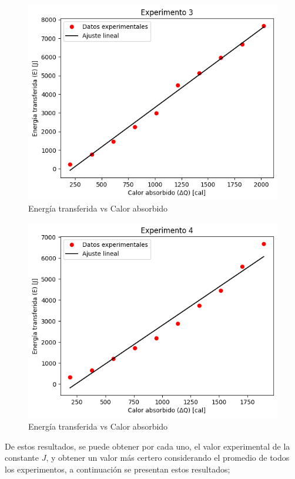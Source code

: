 \documentclass[10pt]{article}
\begin{document}
\begin{multicols*}{2}
\begin{figure}[H]
    \includegraphics[scale=0.45]{exp3.png}
    \caption{Energía transferida vs Calor absorbido}
    \label{datos3}
\end{figure}
\begin{figure}[H]
    \centering
    \includegraphics[scale=0.45]{exp4.png}
    \caption{Energía transferida vs Calor absorbido}
    \label{datos4}
\end{figure}

De estos resultados, se puede obtener por cada uno, el valor experimental de la constante $J$, y obtener un valor más certero considerando el promedio de todos los experimentos, a  continuación se presentan estos resultados;


\end{multicols*}
\end{document}
